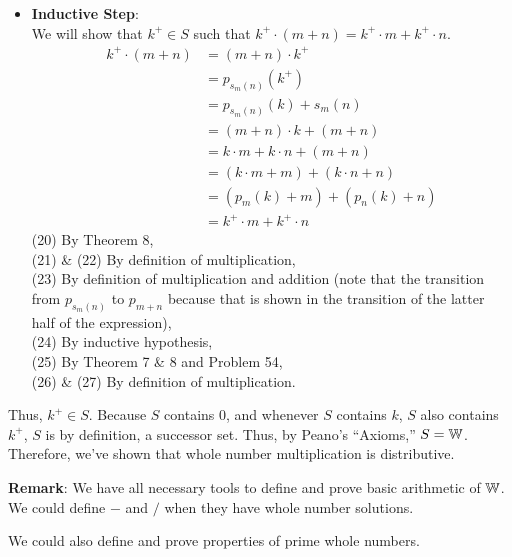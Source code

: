 {\begin{itemize}
                    \item \textbf{Inductive Step}: \\
                    We will show that \(k^+\in S\) such that \(k^+ \cdot (m + n) = k^+ \cdot m + k^+ \cdot n\). 
                    \begin{align}
                        k^+ \cdot (m + n) &= (m + n) \cdot k^+ \\ 
                        &= p_{s_m(n)}(k^+) \\
                        &= p_{s_m(n)}(k) + s_m(n) \\
                        &= (m + n) \cdot k + (m + n) \\
                        &= k \cdot m + k \cdot n + (m + n) \\ 
                        &= (k \cdot m + m) + (k \cdot n + n) \\
                        &= (p_m(k) + m) + (p_n(k) + n) \\
                        &= k^+\cdot m + k^+\cdot n 
                    \end{align}
                    (20) By Theorem 8, \\
                    (21) \& (22) By definition of multiplication, \\
                    (23) By definition of multiplication and addition (note that the transition from \(p_{s_m(n)}\) to \(p_{m + n}\) because that is shown in the transition of the latter half of the expression), \\
                    (24) By inductive hypothesis, \\
                    (25) By Theorem 7 \& 8 and Problem 54, \\
                    (26) \& (27) By definition of multiplication.
                    
                \end{itemize}
                 Thus, \(k^+ \in S\). Because \(S\) contains 0, and whenever \(S\) contains \(k\), \(S\) also contains \(k^+\), \(S\) is by definition, a successor set. Thus, by Peano's ``Axioms,'' \(S = \mathbb{W}\). Therefore, we've shown that whole number multiplication is distributive.
            }

            \noindent\textbf{Remark}: We have all necessary tools to define and prove basic arithmetic of \(\mathbb{W}\). We could define \(-\) and \(/\) when they have whole number solutions.
            
            We could also define and prove properties of prime whole numbers. \\

